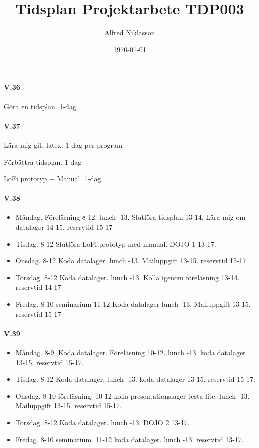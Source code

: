 \documentclass{article}
\title{Tidsplan Projektarbete TDP003}
\author{Alfred Niklasson}
\date{\today}
\begin{document}
\maketitle
\paragraph{V.36}

Göra en tidsplan.  1-dag

\paragraph{V.37}

	Lära mig git, latex.  1-dag per program

	Förbättra tidsplan. 1-dag

	LoFi prototyp + Manual. 1-dag

\paragraph{V.38}

\begin{itemize}
\item	Måndag. Föreläsning 8-12. lunch -13. Slutföra tidsplan 13-14. Lära mig om datalager 14-15. reservtid 15-17 

\item	Tisdag. 8-12 Slutföra LoFi prototyp med manual. DOJO 1 13-17.

\item	Onsdag. 8-12 Koda datalager. lunch -13. Mailuppgift 13-15. reservtid 15-17

\item	Torsdag. 8-12 Koda datalager. lunch -13. Kolla igenom föreläsning 13-14. reservtid 14-17

\item	Fredag. 8-10 seminarium 11-12 Koda datalager lunch -13. Mailuppgift 13-15. reservtid 15-17
\end{itemize}

\paragraph{V.39}

\begin{itemize}
\item	Måndag. 8-9. Koda datalager. Föreläsning 10-12. lunch -13. koda datalager 13-15. reservtid 15-17. 

\item	Tisdag. 8-12 Koda datalager. lunch -13. koda datalager 13-15. reservtid 15-17.

\item	Onsdag. 8-10 föreläsning. 10-12 kolla presentationslager testa lite. lunch -13. Mailuppgift 13-15. reservtid 15-17.

\item	Torsdag. 8-12 Koda datalager. lunch -13. DOJO 2 13-17.

\item	Fredag. 8-10 seminarium. 11-12 koda datalager. lunch -13. reservtid 13-17.
\end{itemize}
\end{document}
